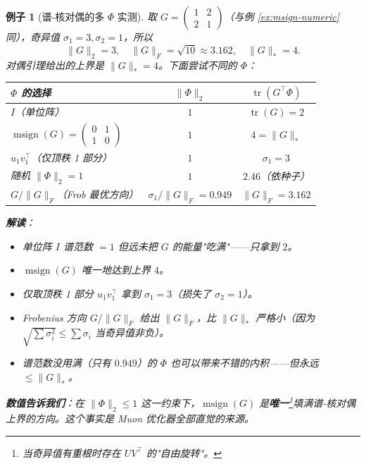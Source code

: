 \documentclass[11pt,a4paper]{article}
\theoremstyle{mythm}
\theoremstyle{mydef}
\newtheorem{example}[theorem]{例子}
\newcommand{\tr}{\operatorname{tr}}
\newcommand{\msign}{\operatorname{msign}}
\begin{document}
\begin{example}[谱-核对偶的多 $\Phi$ 实测]\label{ex:duality-numeric}
取 $G = \begin{pmatrix}1 & 2 \\ 2 & 1\end{pmatrix}$（与例 \ref{ex:msign-numeric} 同），奇异值 $\sigma_1=3, \sigma_2=1$，所以
$$\|G\|_2 = 3,\quad \|G\|_F = \sqrt{10}\approx 3.162,\quad \|G\|_* = 4.$$
对偶引理给出的上界是 $\|G\|_* = 4$。下面尝试不同的 $\Phi$：

\begin{center}
\begin{tabular}{l|c|c}
\hline
$\Phi$ 的选择 & $\|\Phi\|_2$ & $\tr(G^\top \Phi)$ \\\hline
$I$（单位阵）                                   & $1$ & $\tr(G) = 2$ \\
$\msign(G) = \begin{pmatrix}0 & 1\\ 1 & 0\end{pmatrix}$  & $1$ & $\boxed{4 = \|G\|_*}$ \\
$u_1 v_1^\top$（仅顶秩 1 部分）                  & $1$ & $\sigma_1 = 3$ \\
随机 $\|\Phi\|_2 = 1$                           & $1$ & $2.46$（依种子） \\
$G/\|G\|_F$（Frob 最优方向）                     & $\sigma_1/\|G\|_F = 0.949$ & $\|G\|_F = 3.162$ \\\hline
\end{tabular}
\end{center}

\textbf{解读}：
\begin{itemize}[leftmargin=2em]
\item 单位阵 $I$ 谱范数 $=1$ 但远未把 $G$ 的能量"吃满"——只拿到 $2$。
\item $\msign(G)$ 唯一地达到上界 $4$。
\item 仅取顶秩 1 部分 $u_1 v_1^\top$ 拿到 $\sigma_1 = 3$（损失了 $\sigma_2 = 1$）。
\item Frobenius 方向 $G/\|G\|_F$ 给出 $\|G\|_F$，比 $\|G\|_*$ 严格小（因为 $\sqrt{\sum\sigma_i^2} \le \sum\sigma_i$ 当奇异值非负）。
\item 谱范数没用满（只有 $0.949$）的 $\Phi$ 也可以带来不错的内积——但永远 $\le \|G\|_*$。
\end{itemize}

\textbf{数值告诉我们}：在 $\|\Phi\|_2 \le 1$ 这一约束下，$\msign(G)$ 是\textbf{唯一}\footnote{当奇异值有重根时存在 $UV^\top$ 的"自由旋转"。}填满谱-核对偶上界的方向。这个事实是 Muon 优化器全部直觉的来源。
\end{example}
\end{document}
